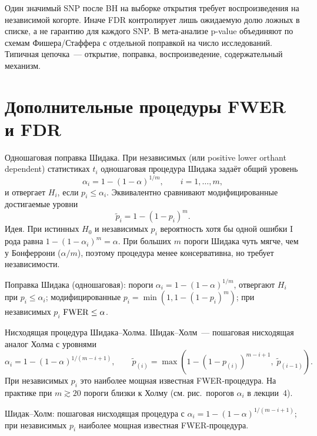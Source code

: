 Один значимый SNP после BH на выборке открытия требует воспроизведения на независимой когорте. Иначе FDR контролирует лишь ожидаемую долю ложных в списке, а не гарантию для каждого SNP. В мета-анализе p-value объединяют по схемам Фишера/Стаффера с отдельной поправкой на число исследований. Типичная цепочка~--- открытие, поправка, воспроизведение, содержательный механизм.

\section{Дополнительные процедуры FWER и FDR}

Одношаговая поправка Шидака. При независимых (или positive lower orthant dependent) статистиках $t_i$ одношаговая процедура Шидака задаёт общий уровень
\[ \alpha_i = 1-(1-\alpha)^{1/m},\qquad i=1,\ldots,m,
\]
и отвергает $H_i$, если $p_i\leq\alpha_i$.
Эквивалентно сравнивают модифицированные достигаемые уровни
\[ \tilde p_i = 1-(1-p_i)^m.
\]
Идея. При истинных $H_0$ и независимых $p_i$ вероятность хотя бы одной ошибки I рода равна $1-(1-\alpha_i)^m=\alpha$.
При больших $m$ пороги Шидака чуть мягче, чем у Бонферрони ($\alpha/m$), поэтому процедура менее консервативна, но требует независимости.

Поправка Шидака (одношаговая): пороги $\alpha_i = 1-(1-\alpha)^{1/m}$, отвергают $H_i$ при $p_i\leq\alpha_i$; модифицированные $p_i = \min(1,1-(1-p_i)^m)$; при независимых $p_i$ $\operatorname{FWER}\leq\alpha$.

Нисходящая процедура Шидака--Холма. Шидак--Холм~--- пошаговая нисходящая аналог Холма с уровнями
\[ \alpha_i = 1-(1-\alpha)^{1/(m-i+1)},\qquad \tilde p_{(i)} = \max\!\left( 1-(1-p_{(i)})^{m-i+1},\; \tilde p_{(i-1)} \right).
\]
При независимых $p_i$ это наиболее мощная известная FWER-процедура. На практике при $m\gtrsim 20$ пороги близки к Холму (см. рис.~порогов $\alpha_i$ в лекции~4).

Шидак--Холм: пошаговая нисходящая процедура с $\alpha_i = 1-(1-\alpha)^{1/(m-i+1)}$; при независимых $p_i$ наиболее мощная известная FWER-процедура.

